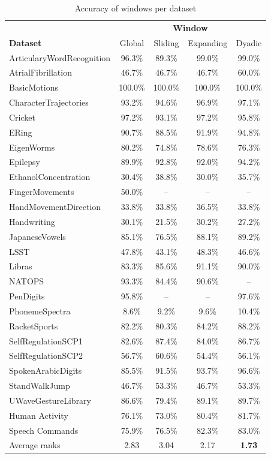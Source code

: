 \documentclass{article}
\theoremstyle{definition}
\theoremstyle{remark}
\begin{document}
	\begin{table}[h]
	\small
	\centering
	\caption{Accuracy of windows per dataset}
	\label{tab:complete_results_windows}
	\begin{tabular}{lcccc}
	\toprule
	& \multicolumn{4}{c}{\textbf{Window}}\\
	 \cmidrule{2-5}
	\textbf{Dataset}&Global & Sliding & Expanding & Dyadic  \\
	\midrule
	ArticularyWordRecognition & 96.3\% & 89.3\% & 99.0\% & 99.0\% \\
	AtrialFibrillation & 46.7\% & 46.7\% & 46.7\% & 60.0\% \\
	BasicMotions & 100.0\% & 100.0\% & 100.0\% & 100.0\% \\
	CharacterTrajectories & 93.2\% & 94.6\% & 96.9\% & 97.1\% \\
	Cricket & 97.2\% & 93.1\% & 97.2\% & 95.8\% \\
	ERing & 90.7\% & 88.5\% & 91.9\% & 94.8\% \\
	EigenWorms & 80.2\% & 74.8\% & 78.6\% & 76.3\% \\
	Epilepsy & 89.9\% & 92.8\% & 92.0\% & 94.2\% \\
	EthanolConcentration & 30.4\% & 38.8\% & 30.0\% & 35.7\% \\
	FingerMovements & 50.0\% & -- & -- & -- \\
	HandMovementDirection & 33.8\% & 33.8\% & 36.5\% & 33.8\% \\
	Handwriting & 30.1\% & 21.5\% & 30.2\% & 27.2\% \\
	JapaneseVowels & 85.1\% & 76.5\% & 88.1\% & 89.2\% \\
	LSST & 47.8\% & 43.1\% & 48.3\% & 46.6\% \\
	Libras & 83.3\% & 85.6\% & 91.1\% & 90.0\% \\
	NATOPS & 93.3\% & 84.4\% & 90.6\% & -- \\
	PenDigits & 95.8\% & -- & -- & 97.6\% \\
	PhonemeSpectra & 8.6\% & 9.2\% & 9.6\% & 10.4\% \\
	RacketSports & 82.2\% & 80.3\% & 84.2\% & 88.2\% \\
	SelfRegulationSCP1 & 82.6\% & 87.4\% & 84.0\% & 86.7\% \\
	SelfRegulationSCP2 & 56.7\% & 60.6\% & 54.4\% & 56.1\% \\
	SpokenArabicDigits & 85.5\% & 91.5\% & 93.7\% & 96.6\% \\
	StandWalkJump & 46.7\% & 53.3\% & 46.7\% & 53.3\% \\
	UWaveGestureLibrary & 86.6\% & 79.4\% & 89.1\% & 89.7\% \\
	Human Activity & 76.1\% & 73.0\% & 80.4\% & 81.7\% \\
	Speech Commands & 75.9\% & 76.5\% & 82.3\% & 83.0\% \\
	\midrule
	Average ranks & 2.83 & 3.04 & 2.17 & \textbf{1.73} \\
	\toprule
	\end{tabular}
	\end{table}
\end{document}
